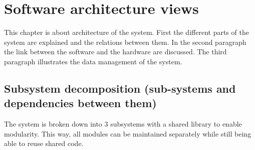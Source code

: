 \documentclass[11pt,a4paper]{article}
\begin{document}
\section{Software architecture views}
This chapter is about architecture of the system. First the different parts of the system are explained and the relations between them. In the second paragraph the link between the software and the hardware are discussed. The third paragraph illustrates the data management of the system.

\subsection{Subsystem decomposition (sub-systems and dependencies between them)}
The system is broken down into 3 subsystems with a shared library to enable modularity. This way, all modules can be maintained separately while still being able to reuse shared code.
\end{document}
